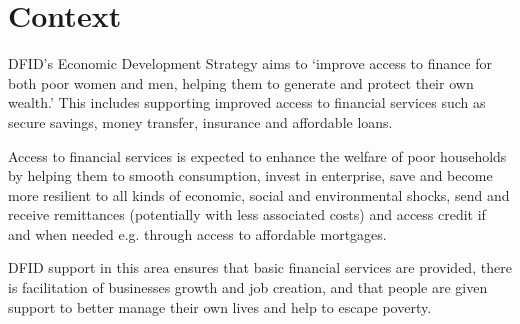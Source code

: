 \section{Context}
DFID's Economic Development Strategy aims to `improve access to finance for both poor women and men,
helping them to generate and protect their own wealth.' %
This includes supporting improved access to financial services such as secure savings, money transfer, insurance and affordable loans. %

Access to financial services is expected to enhance the welfare of poor households by helping them to
smooth consumption, invest in enterprise, save and become more resilient to all kinds of economic, social
and environmental shocks, send and receive remittances (potentially with less associated costs) and
access credit if and when needed e.g. through access to affordable mortgages. %

DFID support in this area ensures that basic financial services are provided, there is facilitation of businesses growth and job creation, and that people are given support to better manage their own lives and help to escape poverty. %

\newpage

